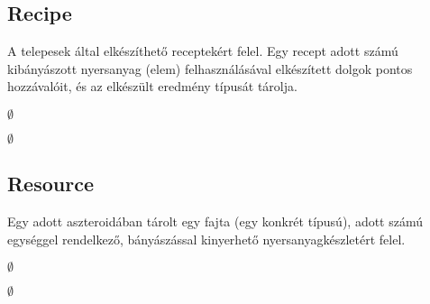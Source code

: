 \subsection{Recipe}
\begin{class-template-responsibility}
A telepesek által elkészíthető receptekért felel. Egy recept adott számú kibányászott nyersanyag (elem) felhasználásával elkészített dolgok pontos hozzávalóit, és az elkészült eredmény típusát tárolja. 
\end{class-template-responsibility}
\begin{class-template-interface}
$\emptyset$
\end{class-template-interface}
\begin{class-template-baseclass}
$\emptyset$
\end{class-template-baseclass}
\begin{class-template-attribute}
\end{class-template-attribute}
\begin{class-template-method}
\end{class-template-method}


\subsection{Resource}
\begin{class-template-responsibility}
Egy adott aszteroidában tárolt egy fajta (egy konkrét típusú), adott számú egységgel rendelkező, bányászással kinyerhető nyersanyagkészletért felel. 
\end{class-template-responsibility}
\begin{class-template-interface}
$\emptyset$
\end{class-template-interface}
\begin{class-template-baseclass}
$\emptyset$
\end{class-template-baseclass}
\begin{class-template-attribute}
\end{class-template-attribute}
\begin{class-template-method}
\end{class-template-method}


